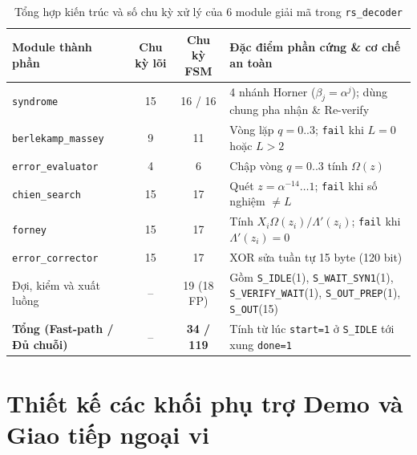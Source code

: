 \begin{table}[!htb]
    \centering
    \caption{Tổng hợp kiến trúc và số chu kỳ xử lý của 6 module giải mã trong \texttt{rs\_decoder}}
    \label{tab:decoder-submodules}
    \footnotesize
    \renewcommand{\arraystretch}{1.1}
    \begin{tabular}{l c c p{6.2cm}}
        \toprule
        \textbf{Module thành phần} & \textbf{Chu kỳ lõi} & \textbf{Chu kỳ FSM} & \textbf{Đặc điểm phần cứng \& cơ chế an toàn} \\
        \midrule
        \texttt{syndrome} & 15 & 16 / 16 & 4 nhánh Horner ($\beta_j=\alpha^j$); dùng chung pha nhận \& Re-verify \\
        \texttt{berlekamp\_massey} & 9 & 11 & Vòng lặp $q=0..3$; \texttt{fail} khi $L=0$ hoặc $L>2$ \\
        \texttt{error\_evaluator} & 4 & 6 & Chập vòng $q=0..3$ tính $\Omega(z)$ \\
        \texttt{chien\_search} & 15 & 17 & Quét $z=\alpha^{-14}\dots 1$; \texttt{fail} khi số nghiệm $\neq L$ \\
        \texttt{forney} & 15 & 17 & Tính $X_i \Omega(z_i)/\Lambda'(z_i)$; \texttt{fail} khi $\Lambda'(z_i)=0$ \\
        \texttt{error\_corrector} & 15 & 17 & XOR sửa tuần tự 15 byte (120 bit) \\
        Đợi, kiểm và xuất luồng & -- & 19 (18 FP) & Gồm \texttt{S\_IDLE}(1), \texttt{S\_WAIT\_SYN1}(1), \texttt{S\_VERIFY\_WAIT}(1), \texttt{S\_OUT\_PREP}(1), \texttt{S\_OUT}(15) \\
        \midrule
        \textbf{Tổng (Fast-path / Đủ chuỗi)} & -- & \textbf{34 / 119} & Tính từ lúc \texttt{start=1} ở \texttt{S\_IDLE} tới xung \texttt{done=1} \\
        \bottomrule
    \end{tabular}
\end{table}

\section{Thiết kế các khối phụ trợ Demo và Giao tiếp ngoại vi}
\label{sec:demo-board}


